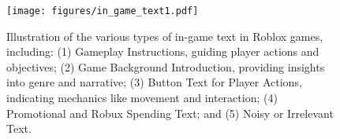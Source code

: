 \begin{figure}[t]
\begin{center}
\centerline{\texttt{[image: figures/in\_game\_text1.pdf]}}

\caption{Illustration of the various types of in-game text in Roblox games, including: (1) Gameplay Instructions, guiding player actions and objectives; (2) Game Background Introduction, providing insights into genre and narrative; (3) Button Text for Player Actions, indicating mechanics like movement and interaction; (4) Promotional and Robux Spending Text; and (5) Noisy or Irrelevant Text.}
\label{fig:in_game_text}
\end{center}
\vskip -0.1in
\end{figure}
